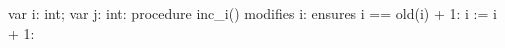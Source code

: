 var i: int;
var j: int:
procedure inc_i()
    modifies i:
    ensures i == old(i) + 1:
{
    i := i + 1:
}